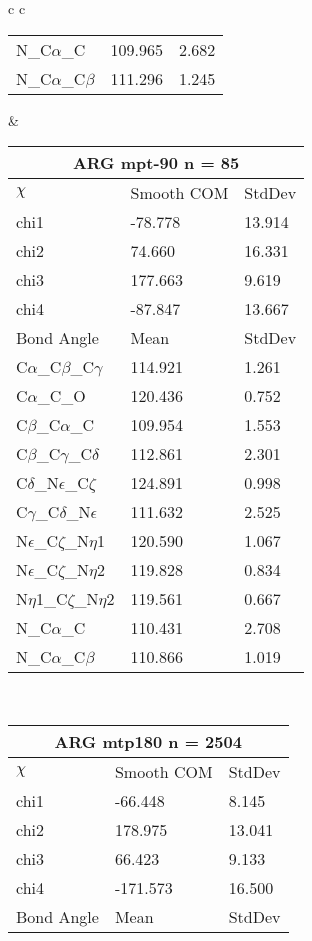 \begin{longtable}{ c c }
\begin{tabular}{ l l l }
  N\_C$\alpha$\_C & 109.965 & 2.682\\
  N\_C$\alpha$\_C$\beta$ & 111.296 & 1.245\\
  \bottomrule
  \end{tabular}
  &
  \begin{tabular}{ l l l }
  \toprule
  \multicolumn{3}{c}{ARG \textbf{mpt-90} n = 85} \\ \toprule
  $\chi$       & Smooth COM & StdDev \\ \midrule
  chi1 & -78.778 & 13.914 \\ 
  chi2 & 74.660 & 16.331 \\ 
  chi3 & 177.663 & 9.619 \\ 
  chi4 & -87.847 & 13.667 \\ \midrule
  Bond Angle   & Mean     & StdDev \\ \midrule
  C$\alpha$\_C$\beta$\_C$\gamma$ & 114.921 & 1.261\\
  C$\alpha$\_C\_O & 120.436 & 0.752\\
  C$\beta$\_C$\alpha$\_C & 109.954 & 1.553\\
  C$\beta$\_C$\gamma$\_C$\delta$ & 112.861 & 2.301\\
  C$\delta$\_N$\epsilon$\_C$\zeta$ & 124.891 & 0.998\\
  C$\gamma$\_C$\delta$\_N$\epsilon$ & 111.632 & 2.525\\
  N$\epsilon$\_C$\zeta$\_N$\eta$1 & 120.590 & 1.067\\
  N$\epsilon$\_C$\zeta$\_N$\eta$2 & 119.828 & 0.834\\
  N$\eta$1\_C$\zeta$\_N$\eta$2 & 119.561 & 0.667\\
  N\_C$\alpha$\_C & 110.431 & 2.708\\
  N\_C$\alpha$\_C$\beta$ & 110.866 & 1.019\\
  \bottomrule
  \end{tabular}
  \\
  \begin{tabular}{ l l l }
  \toprule
  \multicolumn{3}{c}{ARG \textbf{mtp180} n = 2504} \\ \toprule
  $\chi$       & Smooth COM & StdDev \\ \midrule
  chi1 & -66.448 & 8.145 \\ 
  chi2 & 178.975 & 13.041 \\ 
  chi3 & 66.423 & 9.133 \\ 
  chi4 & -171.573 & 16.500 \\ \midrule
  Bond Angle   & Mean     & StdDev \\ \midrule

\end{tabular}
\end{longtable}
